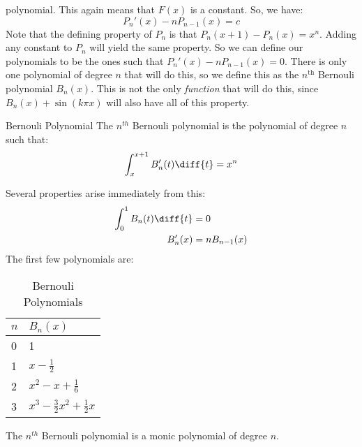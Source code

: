             polynomial. This again means that $F(x)$ is a constant.
            So, we have:
            \begin{equation}
                P_{n}'(x)-nP_{n-1}(x)=c
            \end{equation}
            Note that the defining property of $P_{n}$ is that
            $P_{n}(x+1)-P_{n}(x)=x^{n}$. Adding any constant to
            $P_{n}$ will yield the same property. So we can define
            our polynomials to be the ones such that
            $P_{n}'(x)-nP_{n-1}(x)=0$. There is only one polynomial
            of degree $n$ that will do this, so we define this as
            the $n^{\textrm{th}}$ Bernouli polynomial $B_{n}(x)$.
            This is not the only \textit{function} that will do
            this, since $B_{n}(x)+\sin(k\pi{x})$ will also have
            all of this property.
            \begin{ldefinition}{Bernouli Polynomial}
                The $n^{th}$ Bernouli polynomial is the polynomial
                of degree $n$ such that:
                \begin{equation}
                    \int_{x}^{x+1}B_{n}'(t)\diff{t}=x^{n}
                \end{equation}
            \end{ldefinition}
            Several properties arise immediately from this:
            \begin{align}
                \int_{0}^{1}B_{n}(t)\diff{t}&=0\\
                B_{n}'(x)&=nB_{n-1}(x)
            \end{align}
            The first few polynomials are:
            \begin{table}[H]
                \captionsetup{type=table}
                \centering
                \begin{tabular}{l|l}
                    $n$&$B_{n}(x)$\\
                    \hline
                    0&1\\
                    1&$x-\frac{1}{2}$\\
                    2&$x^{2}-x+\frac{1}{6}$\\
                    3&$x^{3}-\frac{3}{2}x^{2}+\frac{1}{2}x$
                \end{tabular}
                \caption{Bernouli Polynomials}
                \label{tab:Special_Functions_BERNOULI_POLY}
            \end{table}
            \begin{theorem}
                The $n^{th}$ Bernouli polynomial
                is a monic polynomial of degree $n$.
            \end{theorem}
